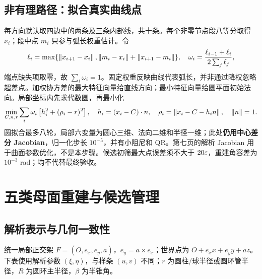 \subsection{非有理路径：拟合真实曲线点}
每方向默认取四边中的两条及三条内部线，共十条。每个非零节点段八等分取得 $x_i$；段中点 $m_i$ 只参与弧长权重估计。令
\begin{equation}
 \ell_i=\max\{\left\lVert x_{i+1}-x_i\right\rVert,\left\lVert m_i-x_i\right\rVert+\left\lVert x_{i+1}-m_i\right\rVert\},\quad
 \omega_i=\frac{\ell_{i-1}+\ell_i}{2\sum_j\ell_j},
\end{equation}
端点缺失项取零，故 $\sum_i\omega_i=1$。固定权重反映曲线代表弧长，并非通过降权忽略超差点。加权协方差的最大特征向量给直线方向；最小特征向量给圆平面初始法向。局部坐标内先求代数圆，再最小化
\begin{equation}
 \min_{C,n,r}\sum_i\omega_i\left[h_i^2+(\rho_i-r)^2\right],\quad
 h_i=(x_i-C)\cdot n,\quad \rho_i=\left\lVert x_i-C-h_in\right\rVert,\quad \left\lVert n\right\rVert=1.
\end{equation}
圆拟合最多八轮，局部六变量为圆心三维、法向二维和半径一维；此处\textbf{仍用中心差分 Jacobian}，归一化步长 $10^{-5}$，并有小阻尼和 QR。第七页的解析 Jacobian 用于曲面参数优化，不是本步骤。候选初筛最大点误差须不大于 $20\varepsilon$，重建角容差为 $10^{-3}$ rad；均不代替最终验收。

\begin{center}
\end{center}

\clearpage
\section{五类母面重建与候选管理}
\subsection{解析表示与几何一致性}
统一局部正交架 $F=(O,e_x,e_y,a)$，$e_y=a\times e_x$；世界点为 $O+e_xx+e_yy+az$。下表使用解析参数 $(\xi,\eta)$，与样条 $(u,v)$ 不同；$r$ 为圆柱/球半径或圆环管半径，$R$ 为圆环主半径，$\beta$ 为半锥角。

